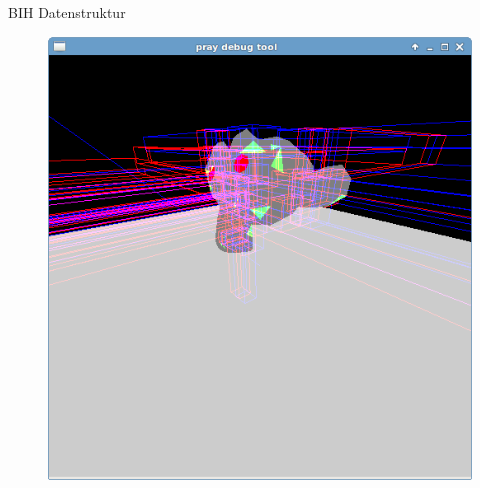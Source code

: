 	\begin{frame}{BIH Datenstruktur}
		\begin{figure}[ht]
		\includegraphics[height=0.8\textheight]{images/bih2.png}
		\end{figure}
	\end{frame}

